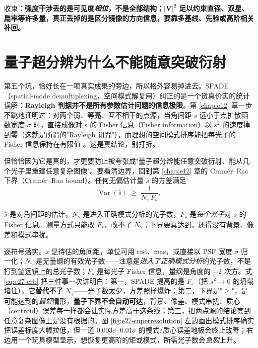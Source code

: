 收束：\textbf{强度干涉丢的是可见度\emph{相位}，不是全部结构；}\(\mathbf{|V|^2}\)\textbf{ 足以约束直径、双星、扁率等许多量，真正丢掉的是区分镜像的方向信息，要靠多基线、先验或高阶相关补回。}


\section{量子超分辨为什么不能随意突破衍射}
\label{sec:e27-superres}

第五个坑，恰好长在一项真实成果的旁边，所以格外容易掉进去。SPADE（spatial-mode demultiplexing，空间模式解复用）纠正的是一个货真价实的统计误解：\textbf{Rayleigh 判据并不是所有参数估计问题的信息极限}。第 \ref{chap:e12} 章一步不跳地证明过：对两个弱、等亮、互不相干的点源，当角间距 \(s\) 远小于点扩散函数宽度 \(\sigma\) 时，直接成像对 \(s\) 的 Fisher 信息（Fisher information）以 \(s^2\) 的速度掉到零（这就是所谓的"Rayleigh 诅咒"），而理想的空间模式排序能把每光子的 Fisher 信息保持在有限值 \citep{2015Optic...2..646T,2016PhRvX...6c1033T,2016OExpr..24.3684N,2017PhRvL.118g0801T}。这是真结论，别打折。

但恰恰因为它是真的，才更要防止被夸张成"量子超分辨能任意突破衍射、能从几个光子里重建任意复杂图像"。要看清边界，回到第 \ref{chap:e12} 章的 Cramér--Rao 下界（Cramér--Rao bound）。任何无偏估计量 \(\hat s\) 的方差满足
\begin{equation}
  \operatorname{Var}(\hat s)\;\ge\;\frac{1}{N_\gamma\,F_s},
  \label{eq:e27-crb}
\end{equation}
\begin{formulaexplain}
\(\hat s\) 是对角间距的估计，\(N_\gamma\) 是进入正确模式分析的光子数，\(F_s\) 是\emph{每个光子}对 \(s\) 的 Fisher 信息。测量方式只能改 \(F_s\)，改不了 \(N_\gamma\)；下界要真达到，还得没有背景、像差和模式串扰。
\end{formulaexplain}

逐符号落实。\(s\) 是待估的角间距，单位可用 rad、mas，或直接以 PSF 宽度 \(\sigma\) 归一化；\(N_\gamma\) 是无量纲的有效光子数——注意是\emph{进入了正确模式分析}的光子数，不是打到望远镜上的总光子数；\(F_s\) 是每光子 Fisher 信息，量纲是角度的 \(-2\) 次方。式 \eqref{eq:e27-crb} 把三件事一次讲明白：第一，SPADE 提高的是 \(F_s\)（把 \(s^2\to0\) 的坍塌堵住），它\textbf{替代不了 }\(N_\gamma\)——光子数太少，方差照样爆炸；第二，下界是"\(\ge\)"，是可能达到的\emph{最好}情形，\textbf{量子下界不会自动可达}，背景、像差、模式串扰、质心（centroid）误差每一样都会让实际方差高于这条线；第三，把两点源的结论套到任意复杂图像上是没有根据的。图 \ref{fig:e27-superresolution} 左边画出模式排序确实把误差标度大幅拉低，但一道 \(0.003\sigma\)--\(0.01\sigma\) 的模式/质心误差地板会终止改善；右边用一个玩具模型显示，想恢复更高阶的矩或模式，所需光子数会\emph{急剧}上升。

